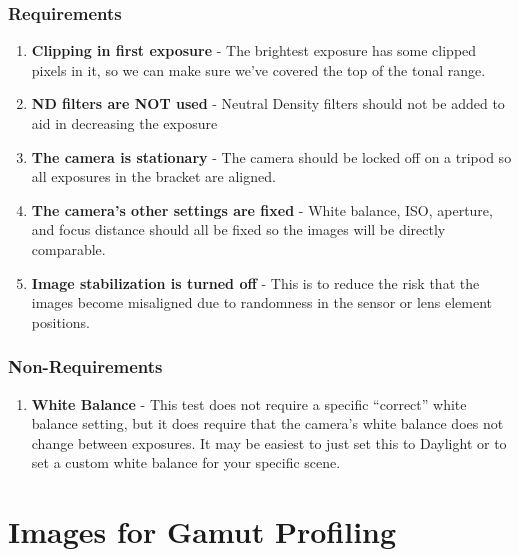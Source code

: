 \documentclass[twoside]{article}
\begin{document}
\subsubsection*{Requirements}
\begin{enumerate}
    \item \textbf{Clipping in first exposure} - The brightest exposure has some clipped pixels in it, so we can make sure we've covered the top of the tonal range.
    \item \textbf{ND filters are NOT used} - Neutral Density filters should not be added to aid in decreasing the exposure
    \item \textbf{The camera is stationary} - The camera should be locked off on a tripod so all exposures in the bracket are aligned.
    \item \textbf{The camera's other settings are fixed} - White balance, ISO, aperture, and focus distance should all be fixed so the images will be directly comparable.
    \item \textbf{Image stabilization is turned off} - This is to reduce the risk that the images become misaligned due to randomness in the sensor or lens element positions.
\end{enumerate}

\subsubsection*{Non-Requirements}
\begin{enumerate}
    \item \textbf{White Balance} - This test does not require a specific ``correct'' white balance setting, but it does require that the camera's white balance does not change between exposures. It may be easiest to just set this to Daylight or to set a custom white balance for your specific scene.
\end{enumerate}

\section{Images for Gamut Profiling}
\end{document}
